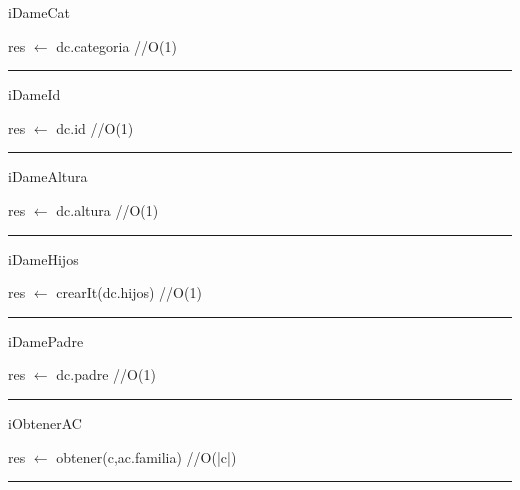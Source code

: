 \begin{algorithm}[H]
\caption{iDameCat}
\begin{algorithmic}[1]
\state res $\gets$ dc.categoria \hfill //O(1)
\EndFunction 
\end{algorithmic}
\hrule
{}
\end{algorithm}

\begin{algorithm}[H]
\caption{iDameId}
\begin{algorithmic}[1]
\state res $\gets$ dc.id \hfill //O(1)
\EndFunction 
\end{algorithmic}
\hrule
{}
\end{algorithm}

\begin{algorithm}[H]
\caption{iDameAltura}
\begin{algorithmic}[1]
\state res $\gets$ dc.altura \hfill //O(1)
\EndFunction 
\end{algorithmic}
\hrule
{}
\end{algorithm}

\begin{algorithm}[H]
\caption{iDameHijos}
\begin{algorithmic}[1]
\state res $\gets$ crearIt(dc.hijos) \hfill //O(1)
\EndFunction 
\end{algorithmic}
\hrule
{}
\end{algorithm}

\begin{algorithm}[H]
\caption{iDamePadre}
\begin{algorithmic}[1]
\state res $\gets$ dc.padre \hfill //O(1)
\EndFunction 
\end{algorithmic}
\hrule
{}
\end{algorithm}

\begin{algorithm}[H]
\caption{iObtenerAC}
\begin{algorithmic}[1]
\state res $\gets$ obtener(c,ac.familia) \hfill //O(|c|)
\EndFunction 
\end{algorithmic}
\hrule
{}
\end{algorithm}

